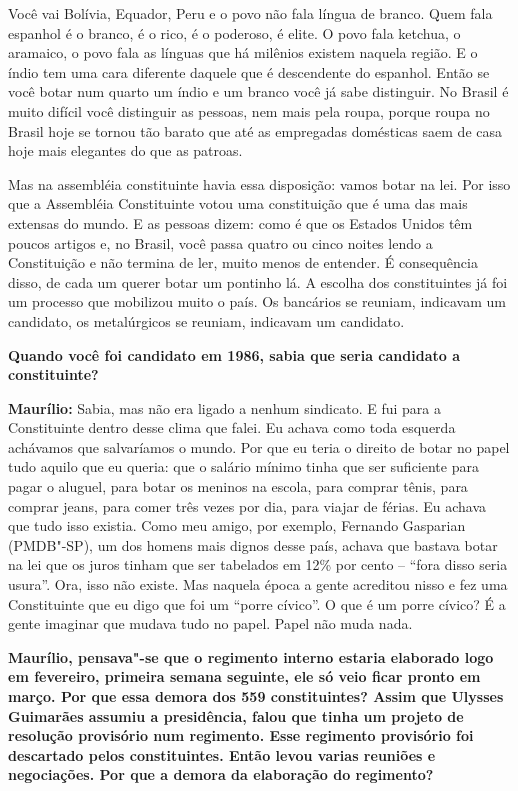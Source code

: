 Você vai Bolívia, Equador, Peru e o povo não fala língua de branco. Quem
fala espanhol é o branco, é o rico, é o poderoso, é elite. O povo fala
ketchua, o aramaico, o povo fala as línguas que há milênios existem
naquela região. E o índio tem uma cara diferente daquele que é
descendente do espanhol. Então se você botar num quarto um índio e um
branco você já sabe distinguir. No Brasil é muito difícil você
distinguir as pessoas, nem mais pela roupa, porque roupa no Brasil hoje
se tornou tão barato que até as empregadas domésticas saem de casa hoje
mais elegantes do que as patroas.

Mas na assembléia constituinte havia essa disposição: vamos botar na
lei. Por isso que a Assembléia Constituinte votou uma constituição que é
uma das mais extensas do mundo. E as pessoas dizem: como é que os
Estados Unidos têm poucos artigos e, no Brasil, você passa quatro ou
cinco noites lendo a Constituição e não termina de ler, muito menos de
entender. É consequência disso, de cada um querer botar um pontinho lá.
A escolha dos constituintes já foi um processo que mobilizou muito o
país. Os bancários se reuniam, indicavam um candidato, os metalúrgicos
se reuniam, indicavam um candidato.

\textbf{Quando você foi candidato em 1986, sabia que seria candidato a
constituinte?}

\textbf{Maurílio:} Sabia, mas não era ligado a nenhum sindicato. E fui
para a Constituinte dentro desse clima que falei. Eu achava como toda
esquerda achávamos que salvaríamos o mundo. Por que eu teria o direito
de botar no papel tudo aquilo que eu queria: que o salário mínimo tinha
que ser suficiente para pagar o aluguel, para botar os meninos na
escola, para comprar tênis, para comprar jeans, para comer três vezes
por dia, para viajar de férias. Eu achava que tudo isso existia. Como
meu amigo, por exemplo, Fernando Gasparian (PMDB"-SP), um dos homens mais
dignos desse país, achava que bastava botar na lei que os juros tinham
que ser tabelados em 12\% por cento -- ``fora disso seria usura''. Ora,
isso não existe. Mas naquela época a gente acreditou nisso e fez uma
Constituinte que eu digo que foi um ``porre cívico''. O que é um porre
cívico? É a gente imaginar que mudava tudo no papel. Papel não muda
nada.

\textbf{Maurílio, pensava"-se que o regimento interno estaria elaborado
logo em fevereiro, primeira semana seguinte, ele só veio ficar pronto em
março. Por que essa demora dos 559 constituintes? Assim que Ulysses
Guimarães assumiu a presidência, falou que tinha um projeto de resolução
provisório num regimento. Esse regimento provisório foi descartado pelos
constituintes. Então levou varias reuniões e negociações. Por que a
demora da elaboração do regimento?}

